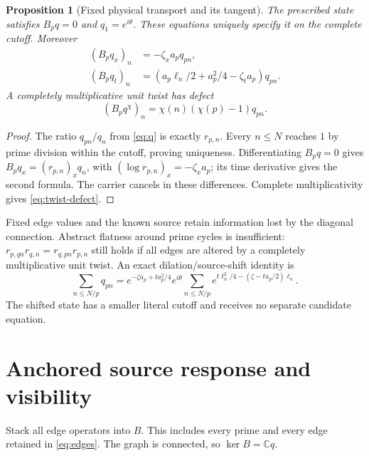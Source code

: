 \documentclass[11pt]{article}
\newtheorem{proposition}[theorem]{Proposition}
\theoremstyle{definition}
\theoremstyle{remark}
\begin{document}
\begin{proposition}[Fixed physical transport and its tangent]
\label{prop:transport}
The prescribed state satisfies $B_pq=0$ and $q_1=e^{i\theta}$.
These equations uniquely specify it on the complete cutoff.
Moreover
\begin{align}
 (B_pq_x)_n&=-\zeta_xa_pq_{pn},\nonumber\\
 (B_pq_t)_n&=(a_p\ell_n/2+a_p^2/4-\zeta_ta_p)q_{pn}.\label{eq:tangent}
\end{align}
A completely multiplicative unit twist has defect
\begin{equation}
 (B_pq^\chi)_n=\chi(n)(\chi(p)-1)q_{pn}.
 \label{eq:twist-defect}
\end{equation}
\end{proposition}
\begin{proof}
The ratio $q_{pn}/q_n$ from \eqref{eq:q} is exactly $r_{p,n}$.
Every $n\le N$ reaches $1$ by prime division within the cutoff, proving
uniqueness. Differentiating $B_pq=0$ gives
$B_pq_x=(r_{p,n})_xq_n$, with
$(\log r_{p,n})_x=-\zeta_xa_p$; its time derivative gives the second
formula. The carrier cancels in these differences. Complete
multiplicativity gives \eqref{eq:twist-defect}.
\end{proof}

Fixed edge values and the known source retain information lost by the
diagonal connection. Abstract flatness around prime cycles is insufficient:
$r_{p,qn}r_{q,n}=r_{q,pn}r_{p,n}$ still holds if all edges are altered
by a completely multiplicative unit twist. An exact dilation/source-shift identity is
\begin{equation}
 \sum_{n\le N/p}q_{pn}
 =e^{-\zeta a_p+ta_p^2/4}e^{i\theta}
   \sum_{n\le N/p}e^{t\ell_n^2/4-(\zeta-ta_p/2)\ell_n}.
 \label{eq:shifted-source}
\end{equation}
The shifted state has a smaller literal cutoff and receives no separate
candidate equation.

\section{Anchored source response and visibility}
\label{sec:visibility}

Stack all edge operators into $B$. This includes every prime and every
edge retained in \eqref{eq:edges}. The graph is connected, so
$\ker B=\mathbb Cq$.
\end{document}
